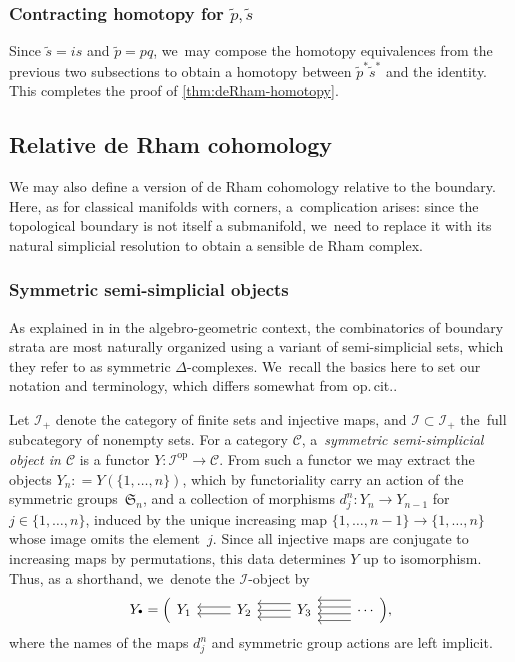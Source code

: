 \documentclass[JEP,XML,SOM,Unicode,NoFloatCountersInSection,published]{cedram}
\let\oldbullet\bullet
\renewcommand{\bullet}{{\raisebox{1pt}{$\scriptscriptstyle\oldbullet$}}}
\newcommand{\rBrac}[1]{\Bigl(#1\Bigr)}
\theoremstyle{definition}
\theoremstyle{remark}
\let\defn\emph
\newcommand{\tp}{\tilde p}
\newcommand{\ts}{\tilde s}
\newcommand{\defas}{\mathrel{\mathop:}=}
\newcommand{\symgp}[1]{\mathfrak{S}_{#1}}
\newcommand{\simp}[3]
{
\begin{tikzcd}[ampersand replacement=\&]
     {#1} \& {#2} \ar[l,shift left = 1]\ar[l,shift right=1] \& {#3} \ar[l,shift left = 2]\ar[l,shift left = 0]\ar[l,shift left = -2] \& \ar[l,shift left = 3]\ar[l,shift left = 1]\ar[l,shift left = -1]\ar[l,shift left = -3] \cdots
    \end{tikzcd}
}
\newcommand{\scat}{\mathscr{I}}
\newcommand{\ascat}{\mathscr{I}_+}
\newcommand{\op}{\mathrm{op}}
\begin{document}
\subsubsection{Contracting homotopy for $\tp,\ts$}\label{sec:deRham-htpy3}

Since $\ts = is$ and $\tp = p q$, we~may compose the homotopy equivalences from the previous two subsections to obtain a homotopy between $\tp^*\ts^*$ and the identity. This completes the proof of \autoref{thm:deRham-homotopy}.

\subsection{Relative de Rham cohomology}
\label{sec:relative-cohomology}

We may also define a version of de Rham cohomology relative to the boundary. Here, as for classical manifolds with corners, a~complication arises: since the topological boundary is not itself a submanifold, we~need to replace it with its natural simplicial resolution to obtain a sensible de Rham complex.

\subsubsection{Symmetric semi-simplicial objects}\label{sec:semi-simplicial-objects}
As explained in \cite{ChanGalatiusPayne} in the algebro-geometric context, the combinatorics of boundary strata are most naturally organized using a variant of semi-simplicial sets, which they refer to as symmetric $\Delta$-complexes. We~recall the basics here to set our notation and terminology, which differs somewhat from {op.\,cit.}.

Let $\ascat$ denote the category of finite sets and injective maps, and $\scat\!\subset\!\ascat$ the~full subcategory of nonempty sets. For a category $\mathscr{C}$, a~\defn{symmetric semi-simplicial object in $\mathscr{C}$} is a functor $Y\colon \scat^\op \to \mathscr{C}$. From such a functor we may extract the objects $Y_n \!\defas\! Y(\{1,\ldots,n\})$, which by functoriality carry an action of the symmetric groups~$\symgp{n}$, and a collection of morphisms $d_j^n \colon Y_n \to Y_{n-1}$ for $j \in \{1,\ldots, n\}$, induced by the unique increasing map $\{1,\ldots,n-1\} \to \{1,\ldots,n\}$ whose image omits the element~$j$. Since all injective maps are conjugate to increasing maps by permutations, this data determines $Y$ up to isomorphism. Thus, as a shorthand, we~denote the $\scat$-object by\vspace*{-3pt}
\[
Y_\bullet = \rBrac{\simp{Y_1}{Y_2}{Y_3}},
\]
where the names of the maps $d_j^n$ and symmetric group actions are left implicit.
\end{document}
